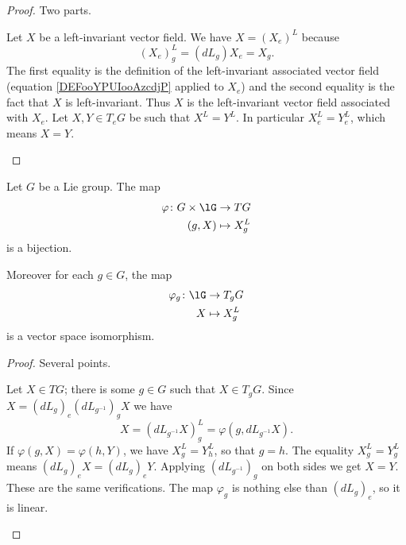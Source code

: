 \begin{proof}
	Two parts.
	\begin{subproof}
		\spitem[Surjective]
		Let \( X\) be a left-invariant vector field. We have \( X=(X_e)^L\) because
		\begin{equation}
			(X_e)^L_g=(dL_g)X_e=X_g.
		\end{equation}
		The first equality is the definition of the left-invariant associated vector field (equation \eqref{DEFooYPUIooAzcdjP} applied to \( X_e\)) and the second equality is the fact that \( X\) is left-invariant. Thus \( X\) is the left-invariant vector field associated with \( X_e\).
		\spitem[Injective]
		Let \( X,Y\in T_eG\) be such that \( X^L=Y^L\). In particular \( X^L_e=Y^L_e\), which means \( X=Y\).
	\end{subproof}
\end{proof}

\begin{proposition}
	Let \( G\) be a Lie group. The map
	\begin{equation}
		\begin{aligned}
			\varphi\colon G\times \lG & \to TG        \\
			(g,X)                     & \mapsto X^L_g
		\end{aligned}
	\end{equation}
	is a bijection.

	Moreover for each \( g\in G\), the map
	\begin{equation}
		\begin{aligned}
			\varphi_g\colon \lG & \to T_gG      \\
			X                   & \mapsto X^L_g
		\end{aligned}
	\end{equation}
	is a vector space isomorphism.
\end{proposition}

\begin{proof}
	Several points.
	\begin{subproof}
		Let \( X\in TG\); there is some \( g\in G\) such that \( X\in T_gG\). Since \( X=(dL_g)_e(dL_{g^{-1}})_gX\) we have
		\begin{equation}
			X=(dL_{g^{-1}}X)^L_g=\varphi(g,dL_{g^{-1}}X).
		\end{equation}
		If \( \varphi(g,X)=\varphi(h,Y)\), we have \( X_g^L=Y^L_h\), so that \( g=h\). The equality  \( X_g^L=Y_g^L\) means \( (dL_g)_eX=(dL_g)_eY\). Applying \( (dL_{g^{-1}})_g\) on both sides we get \( X=Y\).
		These are the same verifications.
		The map \( \varphi_g\) is nothing else than \( (dL_g)_e\), so it is linear.
	\end{subproof}
\end{proof}



